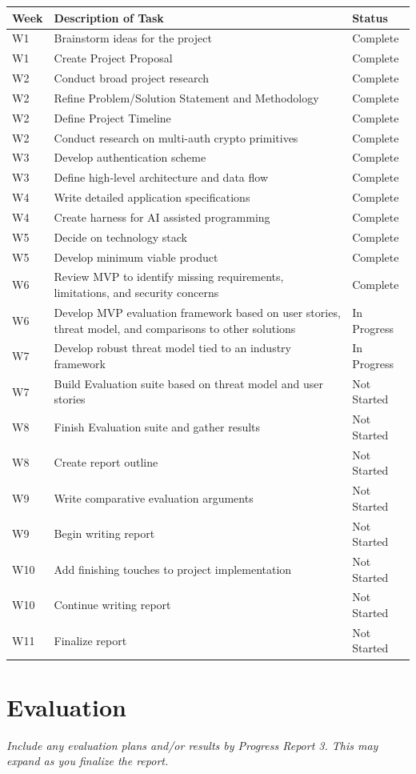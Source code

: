 \documentclass[12pt]{article}
\newcommand{\tlrow}[3]{#1 & #2 & #3 \\}
\newcommand{\instruction}[1]{{\small\itshape #1}}
\begin{document}
\vspace{0.5em}
\begin{tabularx}{\linewidth}{@{} l X l @{}}
  \toprule
  \textbf{Week} & \textbf{Description of Task} & \textbf{Status} \\
  \midrule
  \tlrow{W1}  {Brainstorm ideas for the project} {Complete}
  \tlrow{W1}  {Create Project Proposal} {Complete}
  \tlrow{W2}  {Conduct broad project research} {Complete}
  \tlrow{W2}  {Refine Problem/Solution Statement and Methodology} {Complete}
  \tlrow{W2}  {Define Project Timeline} {Complete}
  \tlrow{W2}  {Conduct research on multi-auth crypto primitives} {Complete}
  \tlrow{W3}  {Develop authentication scheme} {Complete}
  \tlrow{W3}  {Define high-level architecture and data flow} {Complete}
  \tlrow{W4}  {Write detailed application specifications} {Complete}
  \tlrow{W4}  {Create harness for AI assisted programming} {Complete}
  \tlrow{W5}  {Decide on technology stack} {Complete}
  \tlrow{W5}  {Develop minimum viable product} {Complete}
  \tlrow{W6}  {Review MVP to identify missing requirements, limitations, and security concerns} {Complete}
  \tlrow{W6}  {Develop MVP evaluation framework based on user stories, threat model, and comparisons to other solutions} {In Progress}
  \tlrow{W7}  {Develop robust threat model tied to an industry framework} {In Progress}
  \tlrow{W7}  {Build Evaluation suite based on threat model and user stories} {Not Started}
  \tlrow{W8}  {Finish Evaluation suite and gather results} {Not Started}
  \tlrow{W8}  {Create report outline} {Not Started}
  \tlrow{W9}  {Write comparative evaluation arguments} {Not Started}
  \tlrow{W9}  {Begin writing report} {Not Started}
  \tlrow{W10} {Add finishing touches to project implementation} {Not Started}
  \tlrow{W10} {Continue writing report} {Not Started}
  \tlrow{W11} {Finalize report} {Not Started}
  \bottomrule
\end{tabularx}

\section*{Evaluation}

\instruction{Include any evaluation plans and/or results by Progress Report 3. This may expand as you finalize the report.}
\end{document}
